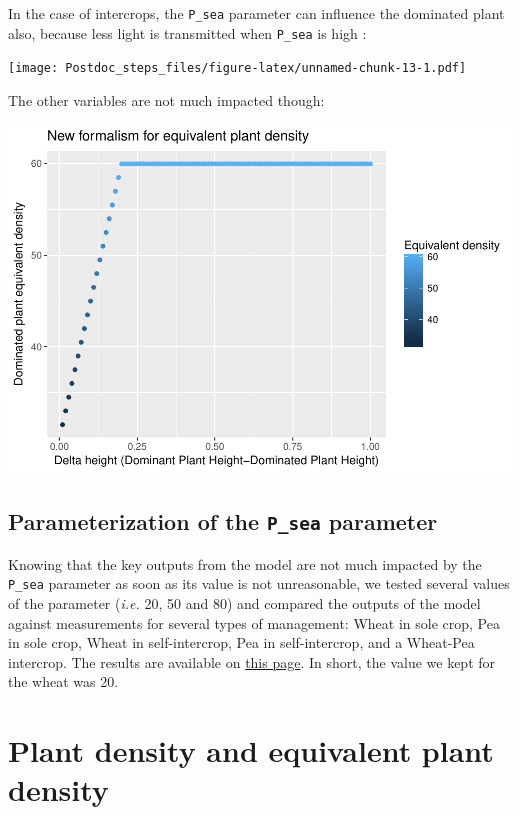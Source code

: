 \documentclass[]{book}
\theoremstyle{definition}
\theoremstyle{definition}
\theoremstyle{definition}
\theoremstyle{remark}
\begin{document}
In the case of intercrops, the \texttt{P\_sea} parameter can influence
the dominated plant also, because less light is transmitted when
\texttt{P\_sea} is high :

\texttt{[image: Postdoc\_steps\_files/figure-latex/unnamed-chunk-13-1.pdf]}

The other variables are not much impacted though:

\includegraphics{Postdoc_steps_files/figure-latex/unnamed-chunk-14-1.pdf}

\section{\texorpdfstring{Parameterization of the \texttt{P\_sea}
parameter}{Parameterization of the P\_sea parameter}}\label{parameterization-of-the-p_sea-parameter}

Knowing that the key outputs from the model are not much impacted by the
\texttt{P\_sea} parameter as soon as its value is not unreasonable, we
tested several values of the parameter (\emph{i.e.} 20, 50 and 80) and
compared the outputs of the model against measurements for several types
of management: Wheat in sole crop, Pea in sole crop, Wheat in
self-intercrop, Pea in self-intercrop, and a Wheat-Pea intercrop. The
results are available on \href{Wheat_EAI.html}{this page}. In short, the
value we kept for the wheat was 20.

\chapter{Plant density and equivalent plant density}\label{plantdensity}
\end{document}
